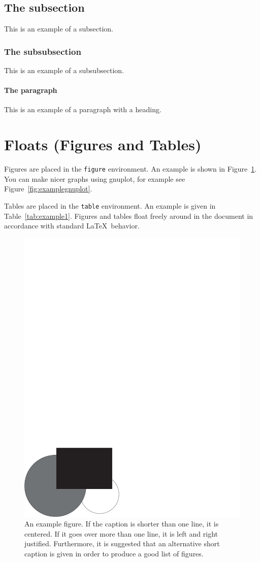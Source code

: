 \subsection{The subsection}

This is an example of a subsection.

\subsubsection{The subsubsection}

This is an example of a subsubsection.

\paragraph{The paragraph}

This is an example of a paragraph with a heading.

\section{Floats (Figures and Tables)}
\label{sec:floats}

Figures are placed in the \texttt{figure} environment. An example is
shown in Figure~\ref{fig:example1}. %
You can make nicer graphs using gnuplot, for example see Figure~\ref{fig:examplegnuplot}.

Tables are placed in the \texttt{table} environment. An example is given in
Table~\ref{tab:example1}. Figures and tables float freely around in the
document in accordance with standard \LaTeX\ behavior.

\begin{figure}[tbp]  %
  \centering
  \includegraphics[width=.5\textwidth]{example_fig}
  \caption[An example figure.]{An example figure. If the caption is
    shorter than one line, it is centered. If it goes over more than
    one line, it is left and right justified. Furthermore, it is
    suggested that an alternative short caption is given in order to
    produce a good list of figures.}
  \label{fig:example1}
\end{figure}


